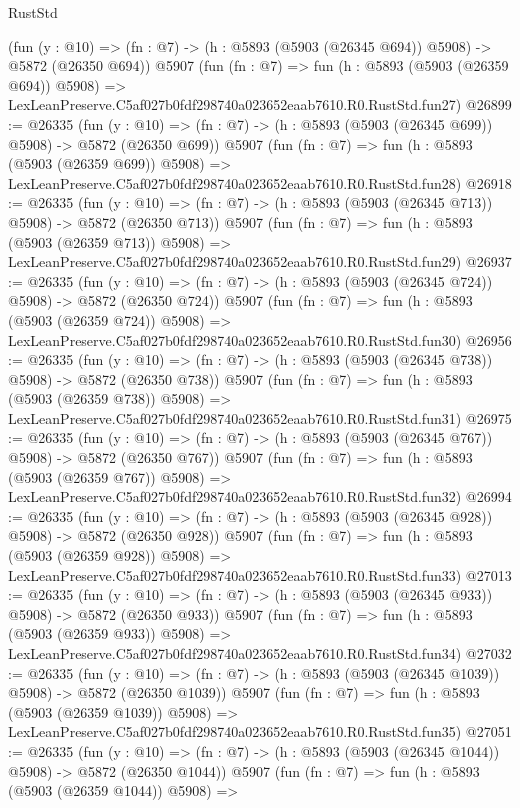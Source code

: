\begin{lexlean}{RustStd}
\begin{coremodule}
    (fun (y : @10) => (fn : @7) -> (h : @5893 (@5903 (@26345 @694)) @5908) -> @5872 (@26350 @694))
    @5907
    (fun (fn : @7) =>
    fun (h : @5893 (@5903 (@26359 @694)) @5908) =>
    LexLeanPreserve.C5af027b0fdf298740a023652eaab7610.R0.RustStd.fun27)
@26899 := @26335
    (fun (y : @10) => (fn : @7) -> (h : @5893 (@5903 (@26345 @699)) @5908) -> @5872 (@26350 @699))
    @5907
    (fun (fn : @7) =>
    fun (h : @5893 (@5903 (@26359 @699)) @5908) =>
    LexLeanPreserve.C5af027b0fdf298740a023652eaab7610.R0.RustStd.fun28)
@26918 := @26335
    (fun (y : @10) => (fn : @7) -> (h : @5893 (@5903 (@26345 @713)) @5908) -> @5872 (@26350 @713))
    @5907
    (fun (fn : @7) =>
    fun (h : @5893 (@5903 (@26359 @713)) @5908) =>
    LexLeanPreserve.C5af027b0fdf298740a023652eaab7610.R0.RustStd.fun29)
@26937 := @26335
    (fun (y : @10) => (fn : @7) -> (h : @5893 (@5903 (@26345 @724)) @5908) -> @5872 (@26350 @724))
    @5907
    (fun (fn : @7) =>
    fun (h : @5893 (@5903 (@26359 @724)) @5908) =>
    LexLeanPreserve.C5af027b0fdf298740a023652eaab7610.R0.RustStd.fun30)
@26956 := @26335
    (fun (y : @10) => (fn : @7) -> (h : @5893 (@5903 (@26345 @738)) @5908) -> @5872 (@26350 @738))
    @5907
    (fun (fn : @7) =>
    fun (h : @5893 (@5903 (@26359 @738)) @5908) =>
    LexLeanPreserve.C5af027b0fdf298740a023652eaab7610.R0.RustStd.fun31)
@26975 := @26335
    (fun (y : @10) => (fn : @7) -> (h : @5893 (@5903 (@26345 @767)) @5908) -> @5872 (@26350 @767))
    @5907
    (fun (fn : @7) =>
    fun (h : @5893 (@5903 (@26359 @767)) @5908) =>
    LexLeanPreserve.C5af027b0fdf298740a023652eaab7610.R0.RustStd.fun32)
@26994 := @26335
    (fun (y : @10) => (fn : @7) -> (h : @5893 (@5903 (@26345 @928)) @5908) -> @5872 (@26350 @928))
    @5907
    (fun (fn : @7) =>
    fun (h : @5893 (@5903 (@26359 @928)) @5908) =>
    LexLeanPreserve.C5af027b0fdf298740a023652eaab7610.R0.RustStd.fun33)
@27013 := @26335
    (fun (y : @10) => (fn : @7) -> (h : @5893 (@5903 (@26345 @933)) @5908) -> @5872 (@26350 @933))
    @5907
    (fun (fn : @7) =>
    fun (h : @5893 (@5903 (@26359 @933)) @5908) =>
    LexLeanPreserve.C5af027b0fdf298740a023652eaab7610.R0.RustStd.fun34)
@27032 := @26335
    (fun (y : @10) => (fn : @7) -> (h : @5893 (@5903 (@26345 @1039)) @5908) -> @5872 (@26350 @1039))
    @5907
    (fun (fn : @7) =>
    fun (h : @5893 (@5903 (@26359 @1039)) @5908) =>
    LexLeanPreserve.C5af027b0fdf298740a023652eaab7610.R0.RustStd.fun35)
@27051 := @26335
    (fun (y : @10) => (fn : @7) -> (h : @5893 (@5903 (@26345 @1044)) @5908) -> @5872 (@26350 @1044))
    @5907
    (fun (fn : @7) =>
    fun (h : @5893 (@5903 (@26359 @1044)) @5908) =>

\end{coremodule}
\end{lexlean}
